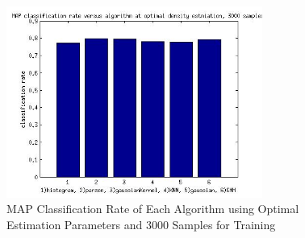 \documentclass[journal]{IEEEtran}
\begin{document}
\begin{figure}
\centering
\includegraphics[width=3.3in]{../images/all_algos_map.jpg}
\caption{MAP Classification Rate of Each Algorithm using Optimal Estimation Parameters and 3000 Samples for Training}
\label{fig:PDF_ALL_MAP}
\end{figure}
\end{document}
